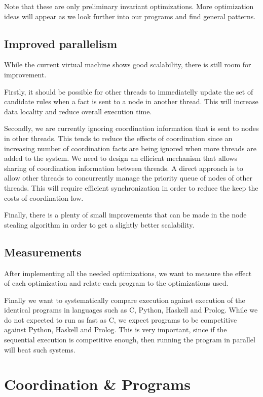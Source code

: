 Note that these are only preliminary invariant optimizations. More optimization ideas will appear
as we look further into our programs and find general patterns.

\subsection{Improved parallelism}

While the current virtual machine shows good scalability, there is still room for improvement.

Firstly, it should be possible for other threads to immediatelly update the set of candidate rules when a fact
is sent to a node in another thread. This will increase data locality and reduce overall execution time.

Secondly, we are currently ignoring coordination information that is sent to nodes in other threads.
This tends to reduce the effects of coordination since an increasing number of
coordination facts are being ignored when more threads are added to the system. We need to design an efficient mechanism that allows sharing of coordination
information between threads. A direct approach is to allow other threads to concurrently manage the priority queue of nodes
of other threads. This will require efficient synchronization in order to reduce the keep the costs of coordination low.

Finally, there is a plenty of small improvements that can be made in the node stealing algorithm in order to
get a slightly better scalability.

\subsection{Measurements}

After implementing all the needed optimizations, we want to measure the effect of each optimization
and relate each program to the optimizations used.

Finally we want to systematically compare \lang execution against execution of the identical programs
in languages such as C, Python, Haskell and Prolog. While we do not expected to run as fast as C,
we expect \lang programs to be competitive against Python, Haskell and Prolog. This is very important, since
if the sequential execution is competitive enough, then running the program in parallel will
beat such systems.

\section{Coordination \& Programs}

